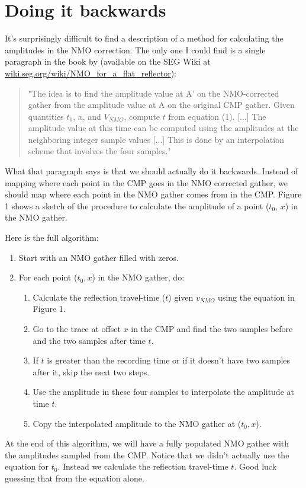 \section{Doing it backwards}

It's surprisingly difficult to find a description of a method for calculating
the amplitudes in the NMO correction.
The only one I could find is a single paragraph in the book by
\citet{Yilmaz_2001} (available on the SEG Wiki at
\href{http://wiki.seg.org/wiki/NMO_for_a_flat_reflector}{wiki.seg.org/wiki/NMO\_for\_a\_flat\_reflector}):

\begin{quotation}
"The idea is to find the amplitude value at A' on the NMO-corrected gather from the amplitude value at A on the original CMP gather. Given quantities $t_0$, $x$, and $V_{NMO}$, compute $t$ from equation (1). [...] The amplitude value at this time can be computed using the amplitudes at the neighboring integer sample values [...] This is done by an interpolation scheme that involves the four samples."
\end{quotation}

What that paragraph says is that we should actually do it backwards.
Instead of mapping where each point in the CMP goes in the NMO corrected
gather, we should map where each point in the NMO gather comes from in the CMP.
Figure 1 shows a sketch of the procedure to calculate the amplitude of a point
($t_0$, $x$) in the NMO gather.

Here is the full algorithm:

\begin{enumerate}
    \item Start with an NMO gather filled with zeros.
    \item For each point ($t_0, x$) in the NMO gather, do:
    \begin{enumerate}
        \item Calculate the reflection travel-time ($t$) given $v_{NMO}$ using
              the equation in Figure 1.
        \item Go to the trace at offset $x$ in the CMP and find the two samples
              before and the two samples after time $t$.
        \item If $t$ is greater than the recording time or if it doesn't have
              two samples after it, skip the next two steps.
        \item Use the amplitude in these four samples to interpolate the
              amplitude at time $t$.
        \item Copy the interpolated amplitude to the NMO gather at ($t_0, x$).
    \end{enumerate}
\end{enumerate}

At the end of this algorithm, we will have a fully populated NMO gather with
the amplitudes sampled from the CMP.
Notice that we didn't actually use the equation for $t_0$.
Instead we calculate the reflection travel-time $t$.
Good luck guessing that from the equation alone.
